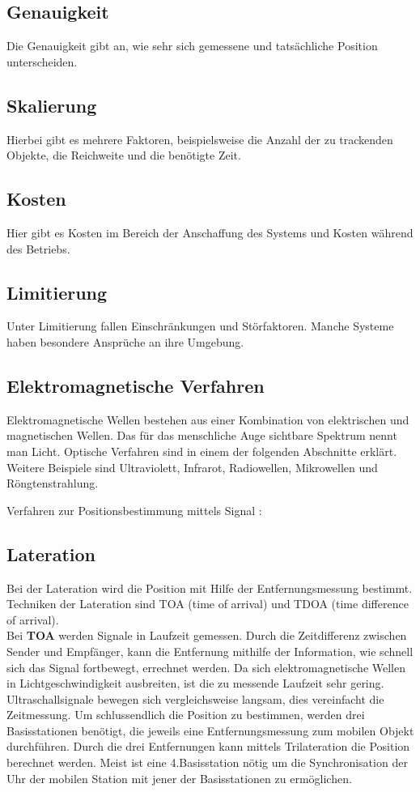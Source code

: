     \subsection*{Genauigkeit}
    Die Genauigkeit gibt an, wie sehr sich gemessene und tatsächliche Position unterscheiden.

    \subsection*{Skalierung}
    Hierbei gibt es mehrere Faktoren, beispielsweise die Anzahl der zu trackenden Objekte, die Reichweite und die benötigte Zeit.

    \subsection*{Kosten}
    Hier gibt es Kosten im Bereich der Anschaffung des Systems und Kosten während des Betriebs.

    \subsection*{Limitierung}
    Unter Limitierung fallen Einschränkungen und Störfaktoren. Manche Systeme haben besondere Ansprüche an ihre Umgebung.

    \subsection{Elektromagnetische Verfahren}
    Elektromagnetische Wellen bestehen aus einer Kombination von elektrischen und magnetischen Wellen. Das für das menschliche Auge sichtbare Spektrum nennt man Licht. Optische Verfahren sind in einem der folgenden Abschnitte erklärt. Weitere Beispiele sind Ultraviolett, Infrarot, Radiowellen, Mikrowellen und Röngtenstrahlung.

    Verfahren zur Positionsbestimmung mittels Signal\cite{pos_signal_2} \cite{pos_signal_4}: 

    \subsection*{Lateration}
    Bei der Lateration wird die Position mit Hilfe der Entfernungsmessung bestimmt.
    Techniken der Lateration sind TOA (time of arrival) und TDOA (time difference of arrival).\\
    Bei \textbf{TOA} werden Signale in Laufzeit gemessen. Durch die Zeitdifferenz zwischen Sender und Empfänger, kann die Entfernung mithilfe der Information, wie schnell sich das Signal fortbewegt, errechnet werden. Da sich elektromagnetische Wellen in Lichtgeschwindigkeit ausbreiten, ist die zu messende Laufzeit sehr gering. Ultraschallsignale bewegen sich vergleichsweise langsam, dies vereinfacht die Zeitmessung.
    Um schlussendlich die Position zu bestimmen, werden drei Basisstationen benötigt, die jeweils eine Entfernungsmessung zum mobilen Objekt durchführen. Durch die drei Entfernungen kann mittels Trilateration die Position berechnet werden. Meist ist eine 4.Basisstation nötig um die Synchronisation der Uhr der mobilen Station mit jener der Basisstationen zu ermöglichen.

